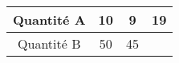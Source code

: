 \begin{tabular}{|c|c|c|c|}
\hline
Quantité A & 10 & 9 & 19 \\ \hline
Quantité B & 50 & 45 & \kern1cm \\ \hline
\end{tabular}

